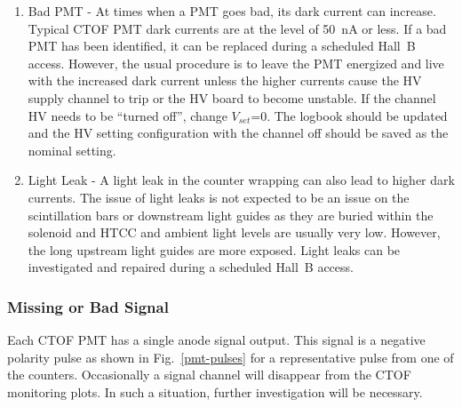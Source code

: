\documentclass[12pt]{article}
\begin{document}
\begin{enumerate}
\item Bad PMT - At times when a PMT goes bad, its dark current can increase. Typical CTOF PMT dark currents
are at the level of 50~nA or less. If a bad PMT has been identified, it can be replaced during a scheduled
Hall~B access. However, the usual procedure is to leave the PMT energized and live with the increased dark
current unless the higher currents cause the HV supply channel to trip or the HV board to become unstable. If
the channel HV needs to be ``turned off'', change $V_{set}$=0. The logbook should be updated and the HV
setting configuration with the channel off should be saved as the nominal setting.
\item Light Leak - A light leak in the counter wrapping can also lead to higher dark currents. The issue of light
leaks is not expected to be an issue on the scintillation bars or downstream light guides as they are buried within
the solenoid and HTCC and ambient light levels are usually very low. However, the long upstream light guides are
more exposed. Light leaks can be investigated and repaired during a scheduled Hall~B access.
\end{enumerate}

\subsubsection{Missing or Bad Signal}
\label{missing}

Each CTOF PMT has a single anode signal output. This signal is a negative polarity pulse as shown in
Fig.~\ref{pmt-pulses} for a representative pulse from one of the counters. Occasionally a signal channel will
disappear from the CTOF monitoring plots. In such a situation, further investigation will be necessary. 
\end{document}
